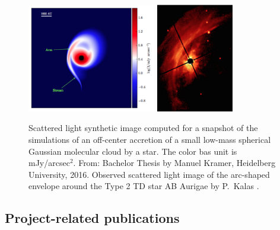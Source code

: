 \documentclass[10pt,fleqn,twoside]{article}
\begin{document}
\begin{figure}
\centerline{\includegraphics[width=0.5\textwidth]{D2Fig/Kramer_Fig4-12-eps-converted-to.pdf}
\hspace{2em}\includegraphics[width=0.3\textwidth]{D2Fig/Kalas-eps-converted-to.pdf}
}
\caption{\label{fig-kramer-4.12} Scattered light
  synthetic image computed for a snapshot of the simulations of an
  off-center accretion of a small low-mass spherical Gaussian molecular
  cloud by a star. The color bas unit is mJy/arcsec$^2$. From: Bachelor
  Thesis by Manuel Kramer, Heidelberg University,
  2016.  Observed scattered light image of the
  arc-shaped envelope around the Type 2 TD star AB Aurigae by P.~Kalas
  \citep{1999ApJ...523L.151G}.}
\end{figure}





\subsection{Project-related publications}

\end{document}
